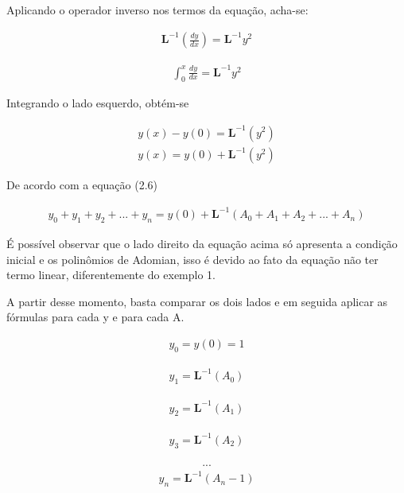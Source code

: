 Aplicando o operador inverso nos termos da equação, acha-se:

\begin{gather*}
 \textbf{L}^{-1}\left(\frac{d y}{d x}\right) = \textbf{L}^{-1} y^2
  \end{gather*}
  
  \begin{gather*}
  \int_0^{x}\frac{d y}{d x} = \textbf{L}^{-1} y^2
\end{gather*} 

Integrando o lado esquerdo, obtém-se

\begin{gather*}
 y(x) - y(0) = \textbf{L}^{-1}(y^2)
\end{gather*} 
\begin{gather*}
 y(x)  = y(0) + \textbf{L}^{-1}(y^2)
\end{gather*}

De acordo com a equação (2.6)


\begin{gather*}
  y_{0} +y_{1} + y_{2} + ... + y_{n}  =  y(0) + \textbf{L}^{-1}( A_{0} +A_{1} + A_{2} + ... + A_{n})
\end{gather*}
 
 É possível observar que o lado direito da equação acima só apresenta a condição inicial e os polinômios de Adomian, isso é devido ao fato da equação não ter termo linear, diferentemente do exemplo 1.
 
 A partir desse momento, basta comparar os dois lados e em seguida aplicar as fórmulas para cada y e para cada A.

\begin{gather*}
  y_{0} = y(0) = 1
\end{gather*}

\begin{gather*}
  y_{1} = \textbf{L}^{-1} (A_{0})
\end{gather*}

\begin{gather*}
  y_{2} = \textbf{L}^{-1} (A_{1})
\end{gather*}

\begin{gather*}
  y_{3} = \textbf{L}^{-1} (A_{2})
\end{gather*}

\begin{gather*}
  ...
\end{gather*}
\begin{gather*}
  y_{n} = \textbf{L}^{-1} (A_{n} - 1)
\end{gather*}

